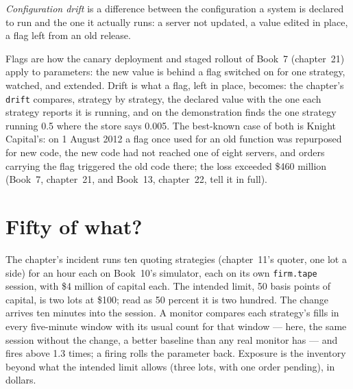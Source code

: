 \begin{definition}\label{def:pl:signal-serving-and-parameter-management:drift}
\emph{Configuration drift} is a difference between the configuration a system is declared to run and the one it
actually runs: a server not updated, a value edited in place, a flag left from an old release.
\end{definition}

Flags are how the canary deployment and staged rollout of Book~7 (chapter~21) apply to parameters: the new value is behind a flag switched on
for one strategy, watched, and extended. Drift is what a flag, left in place, becomes: the chapter's \texttt{drift} compares, strategy by
strategy, the declared value with the one each strategy reports it is running, and on the demonstration finds the one strategy running 0.5
where the store says 0.005. The best-known case of both is Knight Capital's: on 1 August 2012 a flag once used for an old function was
repurposed for new code, the new code had not reached one of eight servers, and orders carrying the flag triggered the old code there; the
loss exceeded \$460 million (Book~7, chapter~21, and Book~13, chapter~22, tell it in full).

\section{Fifty of what?}

The chapter's incident runs ten quoting strategies (chapter~11's quoter, one lot a side) for an hour each on Book~10's simulator, each on its
own \texttt{firm.tape} session, with \$4 million of capital each. The intended limit, 50 basis points of capital, is two lots at \$100; read as
50 percent it is two hundred. The change arrives ten minutes into the session. A monitor compares each strategy's fills in every five-minute
window with its usual count for that window --- here, the same session without the change, a better baseline than any real monitor has --- and
fires above 1.3 times; a firing rolls the parameter back. Exposure is the inventory beyond what the intended limit allows (three lots, with
one order pending), in dollars.

\label{lst:pl:signal-serving-and-parameter-management:monitor}

